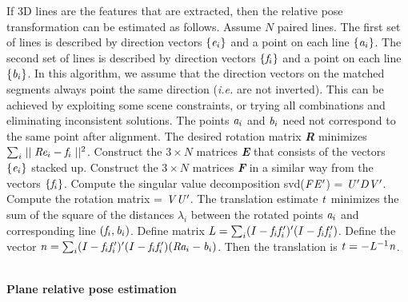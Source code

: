 \documentclass[twocolumn,oneside]{book}
\begin{document}
If 3D lines are the features that are extracted, then
the relative pose transformation can be estimated as follows.
Assume $N$ paired lines. 
The first set of lines is described by
direction vectors $\{{\bf \it e}_i\}$ and a point on each line $\{{\bf \it a}_i\}$.
The second set of lines is described by
direction vectors $\{{\bf \it f}_i\}$ and a point on each line $\{{\bf \it b}_i\}$.
In this algorithm, we assume that the direction vectors on the
matched segments always point the same direction ({\it i.e.} are not inverted).
This can be achieved by exploiting some scene constraints, or trying all 
combinations and eliminating inconsistent solutions.
The points ${\bf \it a}_i$ and ${\bf \it b}_i$ need not correspond to the same point
after alignment.
The desired rotation matrix {\bf \it R}
 minimizes $\sum_i \mid\mid {\bf \it R}{\bf \it e}_i - {\bf \it f}_i \mid\mid^2$.
Construct the $3 \times N$ matrices {\bf \it E} that consists
of the vectors $\{ {\bf \it e}_i \}$ stacked up.
Construct the $3 \times N$ matrices {\bf \it F} in a similar way from the
vectors $\{ {\bf \it f}_i \}$.
Compute the singular value decomposition svd(${\bf \it F}{\bf \it E'}$) = 
${\bf \it U'}{\bf \it D}{\bf \it V'}$.
Compute the rotation matrix = ${\bf \it V}{\bf \it U'}$.
The translation estimate ${\bf \it t}$
minimizes the sum of the square of the distances $\lambda_i$
between the rotated points ${\bf \it a}_i$ and corresponding line $({\bf \it f}_i,{\bf \it b}_i)$.
Define matrix ${\bf \it L} = \sum_i (I - {\bf \it f}_i{\bf \it f}_i')'(I - {\bf \it f}_i{\bf \it f}_i')$.
Define the vector ${\bf \it n} = 
\sum_i (I - {\bf \it f}_i{\bf \it f}_i')'(I - {\bf \it f}_i{\bf \it f}_i') 
({\bf \it R}{\bf \it a}_i - {\bf \it b}_i)$.
Then the translation is ${\bf \it t}= - {\bf \it L}^{-1}{\bf \it n}$.

\ \\
\noindent
{\bf Plane relative pose estimation}
\end{document}
